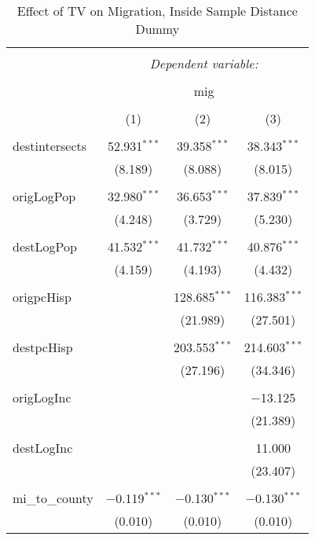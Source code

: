 
\begin{table}[!htbp] \centering 
  \caption{Effect of TV on Migration, Inside Sample Distance Dummy} 
  \label{} 
\begin{tabular}{@{\extracolsep{5pt}}lccc} 
\\[-1.8ex]\hline 
\hline \\[-1.8ex] 
 & \multicolumn{3}{c}{\textit{Dependent variable:}} \\ 
\cline{2-4} 
\\[-1.8ex] & \multicolumn{3}{c}{mig} \\ 
\\[-1.8ex] & (1) & (2) & (3)\\ 
\hline \\[-1.8ex] 
 destintersects & 52.931$^{***}$ & 39.358$^{***}$ & 38.343$^{***}$ \\ 
  & (8.189) & (8.088) & (8.015) \\ 
  & & & \\ 
 origLogPop & 32.980$^{***}$ & 36.653$^{***}$ & 37.839$^{***}$ \\ 
  & (4.248) & (3.729) & (5.230) \\ 
  & & & \\ 
 destLogPop & 41.532$^{***}$ & 41.732$^{***}$ & 40.876$^{***}$ \\ 
  & (4.159) & (4.193) & (4.432) \\ 
  & & & \\ 
 origpcHisp &  & 128.685$^{***}$ & 116.383$^{***}$ \\ 
  &  & (21.989) & (27.501) \\ 
  & & & \\ 
 destpcHisp &  & 203.553$^{***}$ & 214.603$^{***}$ \\ 
  &  & (27.196) & (34.346) \\ 
  & & & \\ 
 origLogInc &  &  & $-$13.125 \\ 
  &  &  & (21.389) \\ 
  & & & \\ 
 destLogInc &  &  & 11.000 \\ 
  &  &  & (23.407) \\ 
  & & & \\ 
 mi\_to\_county & $-$0.119$^{***}$ & $-$0.130$^{***}$ & $-$0.130$^{***}$ \\ 
  & (0.010) & (0.010) & (0.010) \\ 

\end{tabular}
\end{table}
